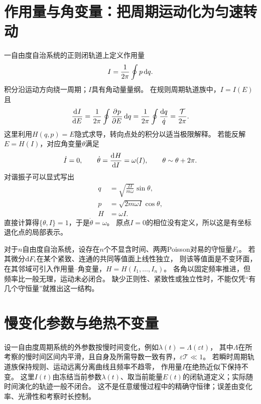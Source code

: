 \section{作用量与角变量：把周期运动化为匀速转动}
一自由度自治系统的正则闭轨道上定义作用量
\begin{equation}
 I = \frac1{2\pi}\oint p\mathop{}\!\mathrm{d} q.
\end{equation}
积分沿运动方向绕一周期；$I$具有角动量量纲。
在规则周期轨道族中，$I = I(E)$且
\begin{equation}
 \frac{\mathop{}\!\mathrm{d}^{}I}{\mathrm{d}{E}^{}} = \frac1{2\pi}\oint\frac{\partial^{}p}{\partial{E}^{}}\mathop{}\!\mathrm{d} q
 = \frac1{2\pi}\oint\frac{\mathop{}\!\mathrm{d} q}{\dot q}
 = \frac{\mathcal T}{2\pi}.
 \label{eq:cm-action-period}
\end{equation}
这里利用$H(q,p) = E$隐式求导，转向点处的积分以适当极限解释。
若能反解$E = H(I)$，对应角变量$\theta$满足
\begin{equation}
 \dot I = 0,\qquad \dot\theta = \frac{\mathop{}\!\mathrm{d}^{}H}{\mathrm{d}{I}^{}} = \omega(I),\qquad \theta \sim \theta + 2\pi.
\end{equation}
对谐振子可以显式写出
\begin{subequations}
 \begin{align}
  q &= \sqrt{\frac{2I}{m\omega}}\sin\theta,\\
  p &= \sqrt{2m\omega I}\cos\theta,\\
  H &= \omega I.
 \end{align}
\end{subequations}
直接计算得$\{\theta,I\} = 1$，于是$\dot\theta = \omega$。
原点$I = 0$的相位没有定义，所以这是有坐标退化点的局部表示。

对于$n$自由度自治系统，设存在$n$个不显含时间、两两Poisson对易的守恒量$F_i$。
若其微分$\mathop{}\!\mathrm{d} F_i$在某个紧致、连通的共同等值面上线性独立，
则该等值面是不变环面，在其邻域可引入作用量--角变量，$H = H(I_1,\ldots,I_n)$。
各角以固定频率推进，但频率比一般无理，运动未必闭合。
缺少正则性、紧致性或独立性时，不能仅凭“有几个守恒量”就推出这一结构。

\section{慢变化参数与绝热不变量}
设一自由度周期系统的外参数按慢时间变化，例如$\lambda(t) = \Lambda(\varepsilon t)$，
其中$\Lambda$在所考察的慢时间区间内平滑，且自身及所需导数一致有界，$\varepsilon\mathcal T \ll 1$。
若瞬时周期轨道族保持规则、运动远离分离曲线且频率不趋零，
作用量$I$在绝热近似下保持不变。
这里$I(t)$由冻结当前参数$\lambda(t)$、取当前能量$E(t)$的闭轨道定义；实际随时间演化的轨迹一般不闭合。
这不是任意缓慢过程中的精确守恒律；误差由变化率、光滑性和考察时长控制。

